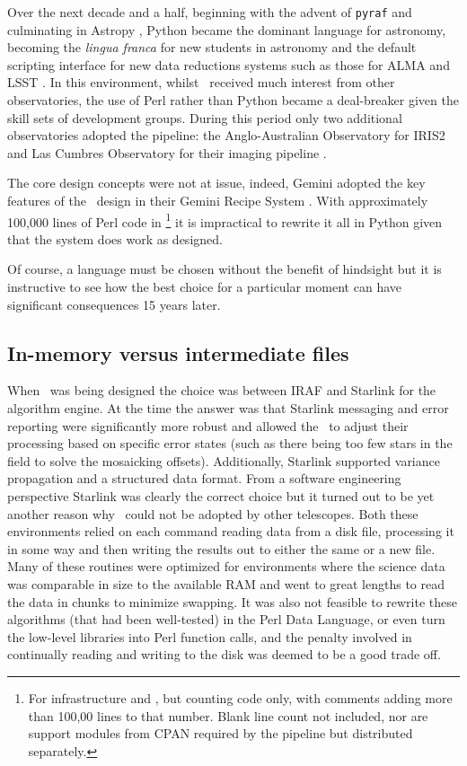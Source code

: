 \documentclass[final,authoryear,5p,times,twocolumn]{elsarticle}
\begin{document}
Over the next decade and a half, beginning with the advent of \texttt{pyraf}
\citep[][]{2000ASPC..216...59G,2006hstc.conf..437G}
and culminating in Astropy \citep{2013A&A...558A..33A},
Python became the dominant language for astronomy,
becoming the \emph{lingua franca} for new students in astronomy and
the default scripting interface for new data reductions systems such
as those for ALMA
\citep{2007ASPC..376..127M} and LSST \citep{2010SPIE.7740E..15A}.
In this environment, whilst \oracdr\ received much interest from other
observatories, the use of Perl rather than Python became a
deal-breaker given the skill sets of development groups. During this
period only two additional observatories adopted the pipeline: the
Anglo-Australian Observatory for IRIS2 \citep{2004SPIE.5492..998T} and Las Cumbres
Observatory for their imaging pipeline \citep{2013PASP..125.1031B}.

The core design concepts were not at issue, indeed, Gemini adopted the
key features of the \oracdr\ design in their Gemini Recipe System
\citep{2014ASPC..485..359L}. With approximately 100,000 lines of Perl code in
\oracdr\footnote{For infrastructure and \primitives, but counting code only, with comments adding more than
  100,00 lines to that
  number. Blank line count not included, nor are support modules from CPAN
  required by the pipeline but distributed separately.} it
is impractical to rewrite it all in Python given that the system does
work as designed.

Of course, a language must be chosen without the benefit of hindsight
but it is instructive to see how the best choice for a particular
moment can have significant consequences 15 years later.

\subsection{In-memory versus intermediate files}

When \oracdr\ was being designed the choice was between IRAF
\citep[][]{2012ASPC..461..595F} and Starlink for the algorithm engine.
At the time the answer was that Starlink messaging and error reporting were
significantly more robust and allowed the \primitives\ to adjust their
processing based on specific error states (such as there being too few
stars in the field to solve the mosaicking offsets). Additionally,
Starlink supported variance propagation and a structured data format.
From a software
engineering perspective Starlink was clearly the correct choice but it
turned out to be yet another reason why \oracdr\ could not be adopted
by other telescopes. Both these environments relied on each command
reading data from a disk file, processing it in some way and then
writing the results out to either the same or a new file. Many of
these routines were optimized for environments where the science data
was comparable in size to the available RAM and went to great lengths
to read the data in chunks to minimize swapping. It was also not
feasible to rewrite these algorithms (that had been well-tested) in
the Perl Data Language, or even turn the low-level libraries into Perl
function calls, and the penalty involved in continually reading
and writing to the disk was deemed to be a good trade off.
\end{document}
